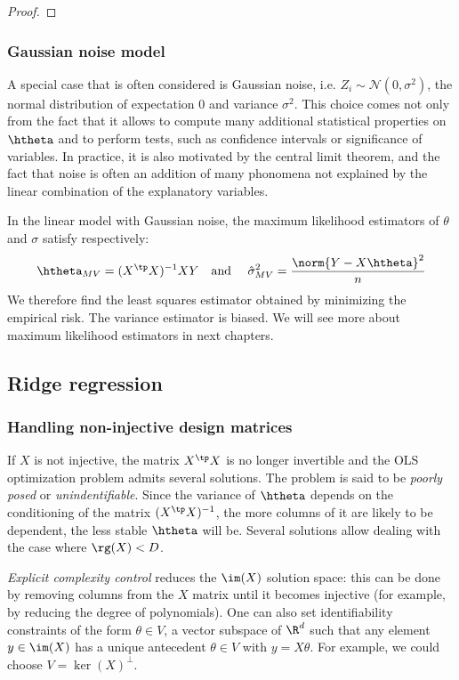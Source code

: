 \documentclass[toc, titlepaged]{../cs-classes/cs-classes}
\begin{document}
\begin{proof}
\end{proof}

\subsubsection{Gaussian noise model}
A special case that is often considered is Gaussian noise, i.e. $Z_i\sim\mathcal{N}(0, \sigma^2)$, the normal distribution of expectation 0 and variance $\sigma^2$. This choice comes not only from the fact that it allows to compute many additional statistical properties on $\htheta$ and to perform tests, such as confidence intervals or significance of variables. In practice, it is also motivated by the central limit theorem, and the fact that noise is often an addition of many phonomena not explained by the linear combination of the explanatory variables.

\begin{property}
    In the linear model with Gaussian noise, the maximum likelihood estimators of $\theta$ and $\sigma$ satisfy respectively:
    \begin{equation*}
        \htheta_{MV}=(X^\tp X)^{-1}XY \quad \textnormal{and} \quad \hat{\sigma}^2_{MV}=\frac{\norm{Y-X\htheta}^2}{n}
    \end{equation*}
    We therefore find the least squares estimator obtained by minimizing the empirical risk. The variance estimator is biased. We will see more about maximum likelihood estimators in next chapters.
\end{property}

\subsection{Ridge regression}
\subsubsection{Handling non-injective design matrices}
If $X$ is not injective, the matrix $X^\tp X$ is no longer invertible and the OLS optimization problem admits several solutions. The problem is said to be \emph{poorly posed} or \emph{unindentifiable}. Since the variance of $\htheta$ depends on the conditioning of the matrix $(X^\tp X)^{-1}$, the more columns of it are likely to be dependent, the less stable $\htheta$ will be. Several solutions allow dealing with the case where $\rg(X)<D$.

\emph{Explicit complexity control} reduces the $\im(X)$ solution space: this can be done by removing columns from the $X$ matrix until it becomes injective (for example, by reducing the degree of polynomials). One can also set identifiability constraints of the form $\theta\in V$, a vector subspace of $\R^d$ such that any element $y\in\im(X)$ has a unique antecedent $\theta\in V$ with $y=X\theta$. For example, we could choose $V=\ker(X)^\bot$.
\end{document}
